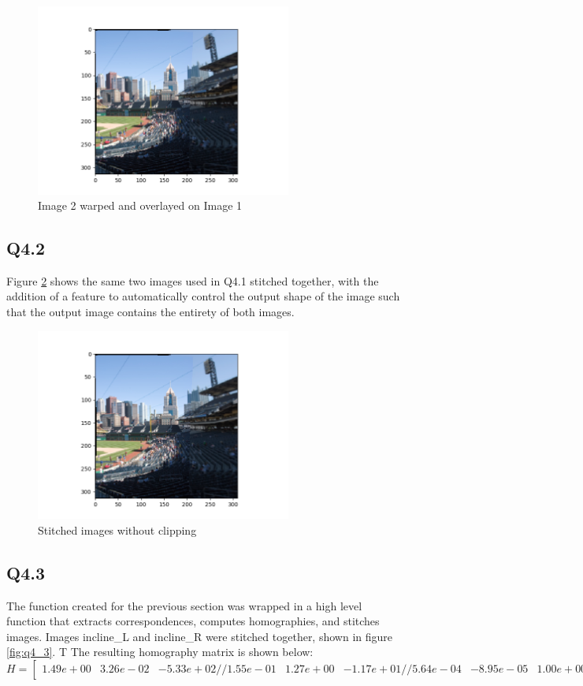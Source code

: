 \documentclass[12pt]{article}
\begin{document}
\begin{figure}[H]
\centering
\includegraphics[page=1,width=0.75\textwidth]{q4_1}
\caption{ Image 2 warped and overlayed on Image 1 }
\label{fig:q41}
\end{figure}   

\subsection { Q4.2 }
Figure \ref{fig:q42} shows the same two images used in Q4.1 stitched together, with the addition of a feature to automatically control the output shape of the image such that the output image contains the entirety of both images.

\begin{figure}[H]
\centering
\includegraphics[page=1,width=0.75\textwidth]{q4_1}
\caption{ Stitched images without clipping}
\label{fig:q42}
\end{figure}   

\subsection { Q4.3 }
The function created for the previous section was wrapped in a high level function that extracts correspondences, computes homographies, and stitches images. Images incline\_L and incline\_R were stitched together, shown in figure \ref{fig:q4_3}.
T
The resulting homography matrix is shown below:
$$
H = 
\begin {bmatrix}
1.49e+00 &  3.26e-02 & -5.33e+02 //
1.55e-01 &  1.27e+00 & -1.17e+01 //
5.64e-04 & -8.95e-05 &  1.00e+00
\end {bmatrix}
$$
\end{document}
